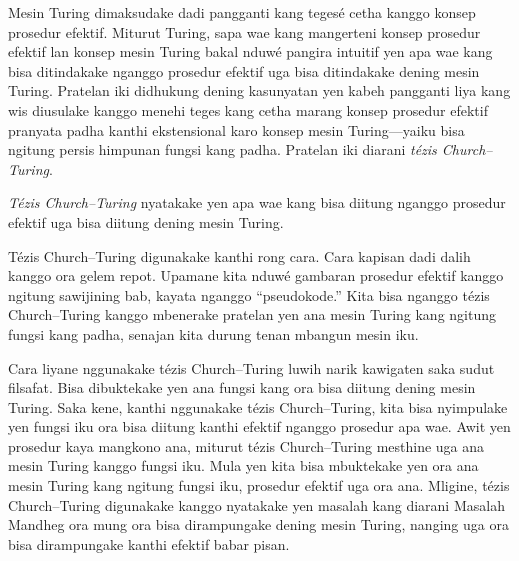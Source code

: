 \documentclass[../../../include/open-logic-section]{subfiles}
\begin{document}

Mesin Turing dimaksudake dadi pangganti kang tegesé
cetha kanggo konsep prosedur efektif. Miturut Turing,
sapa wae kang mangerteni konsep prosedur efektif lan
konsep mesin Turing bakal nduwé pangira intuitif yen
apa wae kang bisa ditindakake nganggo prosedur efektif
uga bisa ditindakake dening mesin Turing. Pratelan iki
didhukung dening kasunyatan yen kabeh pangganti
liya kang wis diusulake kanggo menehi teges kang cetha
marang konsep prosedur efektif pranyata padha kanthi
ekstensional karo konsep mesin Turing---yaiku bisa
ngitung persis himpunan fungsi kang padha. Pratelan
iki diarani \emph{tézis Church--Turing}.

\begin{defn}
\emph{Tézis Church--Turing} nyatakake yen apa wae
kang bisa diitung nganggo prosedur efektif uga bisa
diitung dening mesin Turing.
\end{defn}

Tézis Church--Turing digunakake kanthi rong cara.
Cara kapisan dadi dalih kanggo ora gelem repot.
Upamane kita nduwé gambaran prosedur efektif
kanggo ngitung sawijining bab, kayata nganggo
``pseudokode.'' Kita bisa nganggo tézis
Church--Turing kanggo mbenerake pratelan yen ana
mesin Turing kang ngitung fungsi kang padha, senajan
kita durung tenan mbangun mesin iku.

Cara liyane nggunakake tézis Church--Turing luwih
narik kawigaten saka sudut filsafat. Bisa dibuktekake
yen ana fungsi kang ora bisa diitung dening mesin
Turing. Saka kene, kanthi nggunakake tézis
Church--Turing, kita bisa nyimpulake yen fungsi iku
ora bisa diitung kanthi efektif nganggo prosedur
apa wae. Awit yen prosedur kaya mangkono ana,
miturut tézis Church--Turing mesthine uga ana mesin
Turing kanggo fungsi iku. Mula yen kita bisa mbuktekake
yen ora ana mesin Turing kang ngitung fungsi iku,
prosedur efektif uga ora ana. Mligine, tézis
Church--Turing digunakake kanggo nyatakake yen
masalah kang diarani Masalah Mandheg ora mung ora
bisa dirampungake dening mesin Turing, nanging uga
ora bisa dirampungake kanthi efektif babar pisan.
\end{document}
